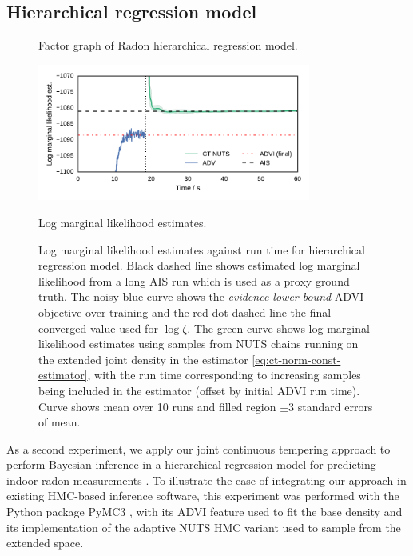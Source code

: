 \subsection{Hierarchical regression model}\label{subsec:exp-hier-regression}

\begin{figure}[h]
\centering
{}
\caption{Factor graph of Radon hierarchical regression model.}
\label{sfig:hier-lin-regression-factor}
\end{figure}%

\begin{figure}[h]
\centering
\vskip 0pt
\centering
\includegraphics[width=0.8\textwidth]{images/continuous-tempering/hier-lin-regression-marg-lik-t2}
\caption{Log marginal likelihood estimates.}\label{sfig:hier-lin-regression-marg-lik}
\vskip 0pt
\caption[Radon hierachical regression model marginal likelihood estimates]{Log marginal likelihood estimates against run time for hierarchical regression model. Black dashed line shows estimated log marginal likelihood from a long \ac{AIS} run which is used as a proxy ground truth. The noisy blue curve shows the \emph{evidence lower bound} \ac{ADVI} objective over training and the red dot-dashed line the final converged value used for $\log\zeta$. The green curve shows log marginal likelihood estimates using samples from \ac{NUTS} chains running on the extended joint density in the estimator \eqref{eq:ct-norm-const-estimator}, with the run time corresponding to increasing samples being included in the estimator (offset by initial \ac{ADVI} run time). Curve shows mean over 10 runs and filled region $\pm 3$ standard errors of mean.}
\label{fig:hier-lin-regression}
\end{figure}

As a second experiment, we apply our joint continuous tempering approach to perform Bayesian inference in a hierarchical regression model for predicting indoor radon measurements \citep{gelman2006data}. To illustrate the ease of integrating our approach in existing \ac{HMC}-based inference software, this experiment was performed with the Python package PyMC3 \citep{salvatier2016probabilistic}, with its \ac{ADVI} feature used to fit the base density and its implementation of the adaptive
\ac{NUTS} \citep{hoffman2014no} \ac{HMC} variant used to sample from the extended space.

